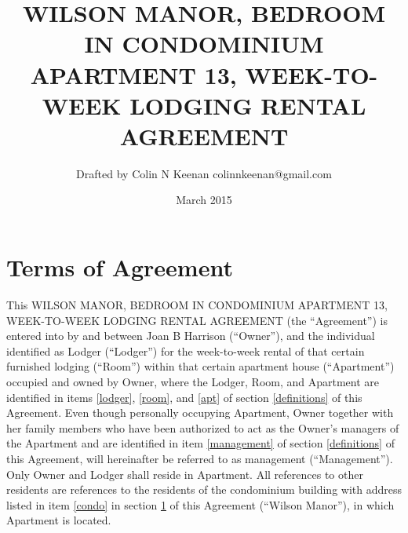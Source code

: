 \documentclass[12pt,letterpaper]{article}
\newcommand{\agreementtitle}{WILSON MANOR, BEDROOM IN CONDOMINIUM APARTMENT 13, WEEK-TO-WEEK LODGING RENTAL AGREEMENT}
\newcommand{\specifics}{Terms of Agreement}
\newcommand{\mom}{Joan B Harrison}
\newcommand{\management}{Management}
\newcommand{\condo}{Wilson Manor}
\newcommand{\apt}{Apartment}
\newcommand{\room}{Room}
\begin{document}
\title{\agreementtitle{}}
\author{Drafted by Colin N Keenan colinnkeenan@gmail.com}
\date{March 2015}
\maketitle
\thispagestyle{fancy}

\noindent \hrulefill
\section{\specifics{}} \label{specifics}
This \agreementtitle{} (the ``Agreement'') is entered into by and between \mom{} (``Owner''), and the individual identified as Lodger (``Lodger'') for the week-to-week rental of that certain furnished lodging (``\room{}'') within that certain apartment house (``\apt{}'') occupied and owned by Owner, where the Lodger, \room{}, and \apt{} are identified in items \ref{lodger}, \ref{room}, and \ref{apt} of section \ref{definitions} of this Agreement. Even though personally occupying \apt{}, Owner together with her family members who have been authorized to act as the Owner's managers of the \apt{} and are identified in item \ref{management} of section \ref{definitions} of this Agreement, will hereinafter be referred to as management (``\management{}''). Only Owner and Lodger shall reside in \apt{}. All references to other residents are references to the residents of the condominium building with address listed in item \ref{condo} in section \ref{specifics} of this Agreement (``\condo{}''), in which \apt{} is located.
\end{document}
